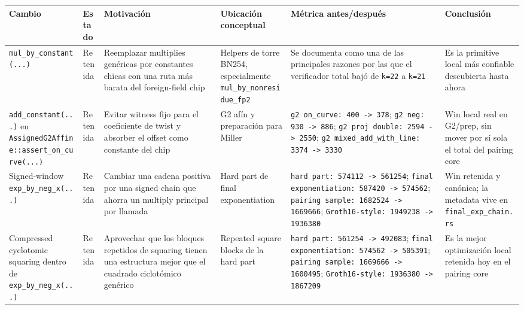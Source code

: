 \documentclass[11pt,a4paper]{article}
\begin{document}
\scriptsize
\begin{longtable}{>{\raggedright\arraybackslash}p{} >{\raggedright\arraybackslash}p{} >{\raggedright\arraybackslash}p{} >{\raggedright\arraybackslash}p{} >{\raggedright\arraybackslash}p{} >{\raggedright\arraybackslash}p{}}
\toprule
\textbf{Cambio} & \textbf{Estado} & \textbf{Motivaci\'on} & \textbf{Ubicaci\'on conceptual} & \textbf{M\'etrica antes/despu\'es} & \textbf{Conclusi\'on} \\
\midrule
\endhead

\texttt{mul\_by\_constant(...)} & Retenida & Reemplazar multiplies gen\'ericas por constantes chicas con una ruta m\'as barata del foreign-field chip & Helpers de torre BN254, especialmente \texttt{mul\_by\_nonresidue\_fp2} & Se documenta como una de las principales razones por las que el verificador total baj\'o de \texttt{k=22} a \texttt{k=21} & Es la primitive local m\'as confiable descubierta hasta ahora \\

\texttt{add\_constant(...)} en \texttt{AssignedG2Affine::assert\_on\_curve(...)} & Retenida & Evitar witness fijo para el coeficiente de twist y absorber el offset como constante del chip & G2 af\'in y preparaci\'on para Miller & \texttt{g2 on\_curve: 400 -> 378}; \texttt{g2 neg: 930 -> 886}; \texttt{g2 proj double: 2594 -> 2550}; \texttt{g2 mixed\_add\_with\_line: 3374 -> 3330} & Win local real en G2/prep, sin mover por s\'i sola el total del pairing core \\

Signed-window \texttt{exp\_by\_neg\_x(...)} & Retenida & Cambiar una cadena positiva por una signed chain que ahorra un multiply principal por llamada & Hard part de final exponentiation & \texttt{hard part: 574112 -> 561254}; \texttt{final exponentiation: 587420 -> 574562}; \texttt{pairing sample: 1682524 -> 1669666}; \texttt{Groth16-style: 1949238 -> 1936380} & Win retenida y can\'onica; la metadata vive en \texttt{final\_exp\_chain.rs} \\

Compressed cyclotomic squaring dentro de \texttt{exp\_by\_neg\_x(...)} & Retenida & Aprovechar que los bloques repetidos de squaring tienen una estructura mejor que el cuadrado ciclot\'omico gen\'erico & Repeated square blocks de la hard part & \texttt{hard part: 561254 -> 492083}; \texttt{final exponentiation: 574562 -> 505391}; \texttt{pairing sample: 1669666 -> 1600495}; \texttt{Groth16-style: 1936380 -> 1867209} & Es la mejor optimizaci\'on local retenida hoy en el pairing core \\


\end{longtable}
\end{document}
